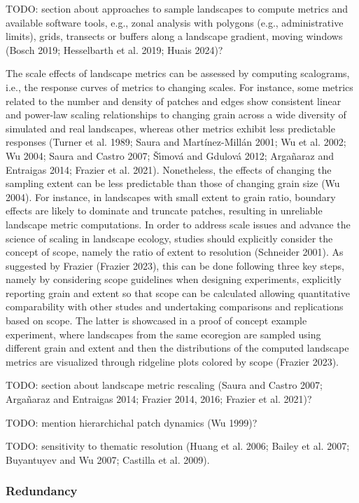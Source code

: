 \documentclass[
  10pt,
  a4paperpaper,
]{article}
\begin{document}
TODO: section about approaches to sample landscapes to compute metrics
and available software tools, e.g., zonal analysis with polygons (e.g.,
administrative limits), grids, transects or buffers along a landscape
gradient, moving windows (Bosch 2019; Hesselbarth et al. 2019; Huais
2024)?

The scale effects of landscape metrics can be assessed by computing
scalograms, i.e., the response curves of metrics to changing scales. For
instance, some metrics related to the number and density of patches and
edges show consistent linear and power-law scaling relationships to
changing grain across a wide diversity of simulated and real landscapes,
whereas other metrics exhibit less predictable responses (Turner et al.
1989; Saura and Martínez-Millán 2001; Wu et al. 2002; Wu 2004; Saura and
Castro 2007; Šı́mová and Gdulová 2012; Argañaraz and Entraigas 2014;
Frazier et al. 2021). Nonetheless, the effects of changing the sampling
extent can be less predictable than those of changing grain size (Wu
2004). For instance, in landscapes with small extent to grain ratio,
boundary effects are likely to dominate and truncate patches, resulting
in unreliable landscape metric computations. In order to address scale
issues and advance the science of scaling in landscape ecology, studies
should explicitly consider the concept of scope, namely the ratio of
extent to resolution (Schneider 2001). As suggested by Frazier (Frazier
2023), this can be done following three key steps, namely by considering
scope guidelines when designing experiments, explicitly reporting grain
and extent so that scope can be calculated allowing quantitative
comparability with other studes and undertaking comparisons and
replications based on scope. The latter is showcased in a proof of
concept example experiment, where landscapes from the same ecoregion are
sampled using different grain and extent and then the distributions of
the computed landscape metrics are visualized through ridgeline plots
colored by scope (Frazier 2023).

TODO: section about landscape metric rescaling (Saura and Castro 2007;
Argañaraz and Entraigas 2014; Frazier 2014, 2016; Frazier et al. 2021)?

TODO: mention hierarchichal patch dynamics (Wu 1999)?

TODO: sensitivity to thematic resolution (Huang et al. 2006; Bailey et
al. 2007; Buyantuyev and Wu 2007; Castilla et al. 2009).

\subsubsection{Redundancy}\label{redundancy}
\end{document}
